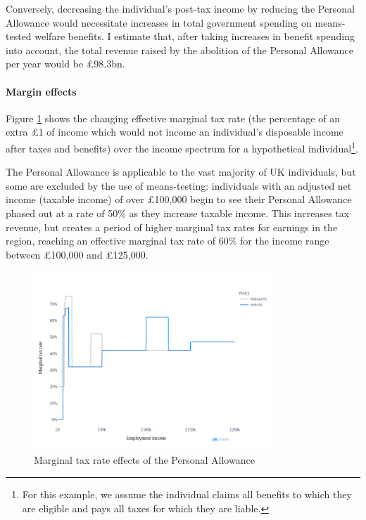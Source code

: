 \documentclass{article}
\begin{document}
    Conversely, decreasing the individual's post-tax income by reducing the Personal Allowance would necessitate increases in total government spending on means-tested welfare benefits. I estimate that, after taking increases in benefit spending into account, the total revenue raised by the abolition of the Personal Allowance per year would be £98.3bn.
    
    \paragraph{Margin effects} Figure \ref{fig:PA_mtr_effects} shows the changing effective marginal tax rate (the percentage of an extra £1 of income which would not income an individual's disposable income after taxes and benefits) over the income spectrum for a hypothetical individual\footnote{For this example, we assume the individual claims all benefits to which they are eligible and pays all taxes for which they are liable.}. 
    
    The Personal Allowance is applicable to the vast majority of UK individuals, but some are excluded by the use of means-testing: individuals with an adjusted net income (taxable income) of over £100,000 begin to see their Personal Allowance phased out at a rate of 50\% as they increase taxable income. This increases tax revenue, but creates a period of higher marginal tax rates for earnings in the region, reaching an effective marginal tax rate of 60\% for the income range between £100,000 and £125,000.

    \begin{figure}
        \centering
        \includegraphics[width=0.8\textwidth]{images/fig_2.png}
        \caption{Marginal tax rate effects of the Personal Allowance}
        \label{fig:PA_mtr_effects}
    \end{figure}
    
\end{document}
